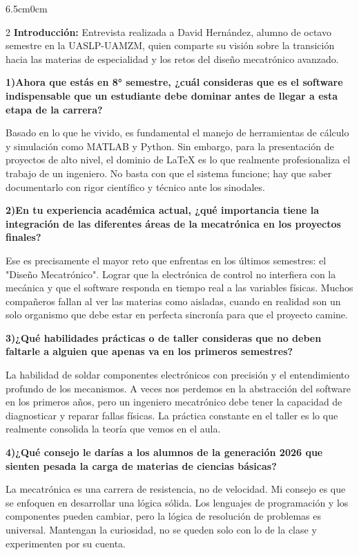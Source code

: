 \documentclass[10pt,twoside]{article}
\begin{document}
\begin{adjustwidth}{6.5cm}{0cm}
\begin{multicols}{2}
\textbf{Introducción:}
Entrevista realizada a David Hernández, alumno de octavo semestre en la UASLP-UAMZM, quien comparte su visión sobre la transición hacia las materias de especialidad y los retos del diseño mecatrónico avanzado.


\textbf{1)Ahora que estás en 8° semestre, ¿cuál consideras que es el software indispensable que un estudiante debe dominar antes de llegar a esta etapa de la carrera?}

Basado en lo que he vivido, es fundamental el manejo de herramientas de cálculo y simulación como MATLAB y Python. Sin embargo, para la presentación de proyectos de alto nivel, el dominio de LaTeX es lo que realmente profesionaliza el trabajo de un ingeniero. No basta con que el sistema funcione; hay que saber documentarlo con rigor científico y técnico ante los sinodales.

\textbf{2)En tu experiencia académica actual, ¿qué importancia tiene la integración de las diferentes áreas de la mecatrónica en los proyectos finales?}

Ese es precisamente el mayor reto que enfrentas en los últimos semestres: el "Diseño Mecatrónico". Lograr que la electrónica de control no interfiera con la mecánica y que el software responda en tiempo real a las variables físicas. Muchos compañeros fallan al ver las materias como aisladas, cuando en realidad son un solo organismo que debe estar en perfecta sincronía para que el proyecto camine.

\textbf{3)¿Qué habilidades prácticas o de taller consideras que no deben faltarle a alguien que apenas va en los primeros semestres?}

La habilidad de soldar componentes electrónicos con precisión y el entendimiento profundo de los mecanismos. A veces nos perdemos en la abstracción del software en los primeros años, pero un ingeniero mecatrónico debe tener la capacidad de diagnosticar y reparar fallas físicas. La práctica constante en el taller es lo que realmente consolida la teoría que vemos en el aula.

\textbf{4)¿Qué consejo le darías a los alumnos de la generación 2026 que sienten pesada la carga de materias de ciencias básicas?}

La mecatrónica es una carrera de resistencia, no de velocidad. Mi consejo es que se enfoquen en desarrollar una lógica sólida. Los lenguajes de programación y los componentes pueden cambiar, pero la lógica de resolución de problemas es universal. Mantengan la curiosidad, no se queden solo con lo de la clase y experimenten por su cuenta.


\end{multicols}
\end{adjustwidth}
\end{document}
